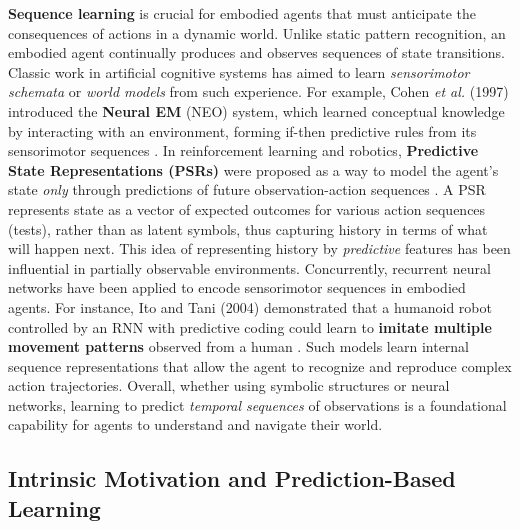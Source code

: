 \documentclass[11pt]{article}
\begin{document}
\textbf{Sequence learning} is crucial for embodied agents that must anticipate the consequences of actions in a dynamic world. Unlike static pattern recognition, an embodied agent continually produces and observes sequences of state transitions. Classic work in artificial cognitive systems has aimed to learn \emph{sensorimotor schemata} or \emph{world models} from such experience. For example, Cohen \emph{et al.} (1997) introduced the \textbf{Neural EM} (NEO) system, which learned conceptual knowledge by interacting with an environment, forming if-then predictive rules from its sensorimotor sequences \cite{Cohen1997}. In reinforcement learning and robotics, \textbf{Predictive State Representations (PSRs)} were proposed as a way to model the agent’s state \emph{only} through predictions of future observation-action sequences \cite{Singh2012}. A PSR represents state as a vector of expected outcomes for various action sequences (tests), rather than as latent symbols, thus capturing history in terms of what will happen next. This idea of representing history by \emph{predictive} features has been influential in partially observable environments. Concurrently, recurrent neural networks have been applied to encode sensorimotor sequences in embodied agents. For instance, Ito and Tani (2004) demonstrated that a humanoid robot controlled by an RNN with predictive coding could learn to \textbf{imitate multiple movement patterns} observed from a human \cite{Ito2004}. Such models learn internal sequence representations that allow the agent to recognize and reproduce complex action trajectories. Overall, whether using symbolic structures or neural networks, learning to predict \emph{temporal sequences} of observations is a foundational capability for agents to understand and navigate their world.

\subsection{Intrinsic Motivation and Prediction-Based Learning}
\end{document}

